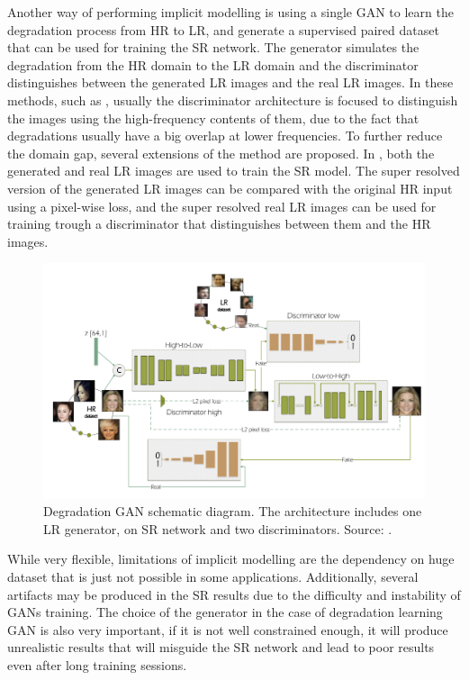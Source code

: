         Another way of performing implicit modelling is using a single GAN to learn the degradation process from HR to LR, and generate a supervised paired dataset that can be used for training the SR network.
        The generator simulates the degradation from the HR domain to the LR domain and the discriminator distinguishes between the generated LR images and the real LR images.
        In these methods, such as \cite{luo2022learning,bulat2018learn}, usually the discriminator architecture is focused to distinguish the images using the high-frequency contents of them, due to the fact that degradations usually have a big overlap at lower frequencies.
        To further reduce the domain gap, several extensions of the method are proposed. 
        In \cite{wei2020unsupervised}, both the generated and real LR images are used to train the SR model.
        The super resolved version of the generated LR images can be compared with the original HR input using a pixel-wise loss, and the super resolved real LR images can be used for training trough a discriminator that distinguishes between them and the HR images.

        \begin{figure}[H]
            \centering
            \includegraphics[width=\textwidth]{Includes/2-degradation-gan.png}
            \caption{Degradation GAN schematic diagram. The architecture includes one LR generator, on SR network and two discriminators. Source: \cite{bulat2018learn}.}    
            \label{fig:2-degradation-gan}
        \end{figure}
        
    
        While very flexible, limitations of implicit modelling are the dependency on huge dataset that is just not possible in some applications. 
        Additionally, several artifacts may be produced in the SR results due to the difficulty and instability of GANs training.
        The choice of the generator in the case of degradation learning GAN is also very important, if it is not well constrained enough, it will produce unrealistic results that will misguide the SR network and lead to poor results even after long training sessions.
         
